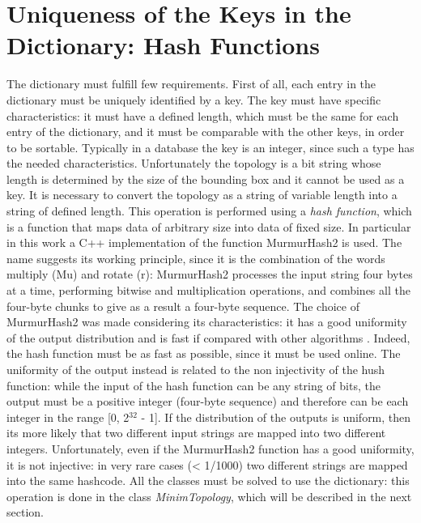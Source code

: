 \section{Uniqueness of the Keys in the Dictionary: Hash Functions}
The dictionary must fulfill few requirements. First of all, each entry in the dictionary must be uniquely identified by a key. The key must have specific characteristics: it must have a defined length, which must be the same for each entry of the dictionary, and it must be comparable with the other keys, in order to be sortable. Typically in a database the key is an integer, since such a type has the needed characteristics. Unfortunately the topology is a bit string whose length is determined by the size of the bounding box and it cannot be used as a key. It is necessary to convert the topology as a string of variable length into a string of defined length. This operation is performed using a \textit{hash function}, which is a function that maps data of arbitrary size into data of fixed size. In particular in this work a C++ implementation of the function MurmurHash2 is used. The name suggests its working principle, since it is the combination of the words multiply (Mu) and rotate (r): MurmurHash2 processes the input string four bytes at a time, performing bitwise and multiplication operations, and combines all the four-byte chunks to give as a result a four-byte sequence. The choice of MurmurHash2 was made considering its characteristics: it has a good uniformity of the output distribution and is fast if compared with other algorithms \cite{hash}. Indeed, the hash function must be as fast as possible, since it must be used online. The uniformity of the output instead is related to the non injectivity of the hush function: while the input of the hash function can be any string of bits, the output must be a positive integer (four-byte sequence) and therefore can be each integer in the range [0, 2$^{32}$ - 1]. If the distribution of the outputs is uniform, then its more likely that two different input strings are mapped into two different integers. Unfortunately, even if the MurmurHash2 function has a good uniformity, it is not injective: in very rare cases (< 1/1000) two different strings are mapped into the same hashcode. All the classes must be solved to use the dictionary: this operation is done in the class \textit{MinimTopology}, which will be described in the next section.
%
